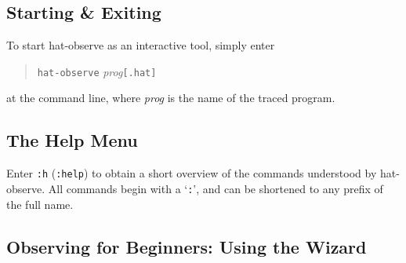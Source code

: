 \documentclass[12pt]{article}
\begin{document}

\subsection{Starting \& Exiting}

To start hat-observe as an interactive tool, simply enter
\begin{quote}
\texttt{hat-observe} \emph{prog}\texttt{[.hat]}
\end{quote}
at the command line, where \emph{prog} is the name of the traced
program.

\subsection{The Help Menu}

Enter \texttt{:h} (\texttt{:help}) to obtain a short overview of
the commands understood by hat-observe.  All commands begin with a
`\texttt{:}', and can be shortened to any prefix of the full name.

\subsection{Observing for Beginners: Using the Wizard}
\end{document}
